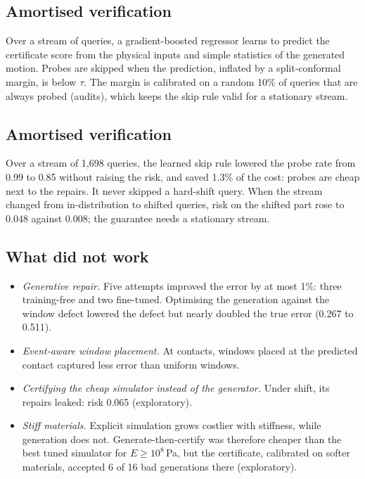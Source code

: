 
\subsection{Amortised verification}
\label{sec:amortise}
Over a stream of queries, a gradient-boosted regressor learns to predict the certificate score from the physical inputs and simple statistics of the generated motion.
Probes are skipped when the prediction, inflated by a split-conformal margin, is below $\tau$.
The margin is calibrated on a random 10\% of queries that are always probed (audits), which keeps the skip rule valid for a stationary stream.


\subsection{Amortised verification}
\label{sec:res-amortise}
Over a stream of 1{,}698 queries, the learned skip rule lowered the probe rate from 0.99 to 0.85 without raising the risk, and saved 1.3\% of the cost: probes are cheap next to the repairs.
It never skipped a hard-shift query.
When the stream changed from in-distribution to shifted queries, risk on the shifted part rose to 0.048 against 0.008; the guarantee needs a stationary stream.


\subsection{What did not work}
\label{sec:res-negative}
\begin{itemize}
\item \emph{Generative repair.} Five attempts improved the error by at most 1\%: three training-free and two fine-tuned.
Optimising the generation against the window defect lowered the defect but nearly doubled the true error (0.267 to 0.511).
\item \emph{Event-aware window placement.} At contacts, windows placed at the predicted contact captured less error than uniform windows.
\item \emph{Certifying the cheap simulator instead of the generator.} Under shift, its repairs leaked: risk 0.065 (exploratory).
\item \emph{Stiff materials.} Explicit simulation grows costlier with stiffness, while generation does not. Generate-then-certify was therefore cheaper than the best tuned simulator for $E \ge 10^8$\,Pa, but the certificate, calibrated on softer materials, accepted 6 of 16 bad generations there (exploratory).
\end{itemize}

